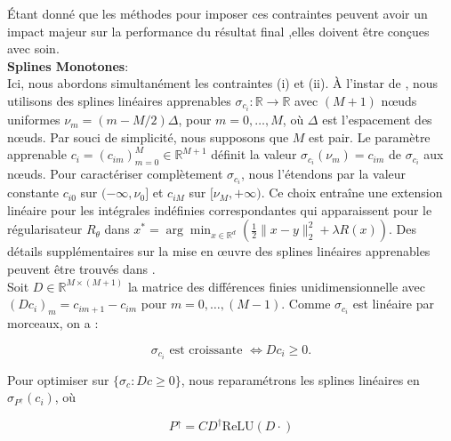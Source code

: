 \documentclass[a4paper, 12pt]{report} %
\begin{document}
Étant donné que les méthodes pour imposer ces contraintes peuvent avoir un impact majeur sur la performance du résultat final ,elles doivent être conçues avec soin.\\
\textbf{Splines Monotones}:\\
Ici, nous abordons simultanément les contraintes (i) et (ii). À l'instar de \cite{bohra2021learning,bohra2020learning}, nous utilisons des splines linéaires apprenables \( \sigma_{c_i} : \mathbb{R} \to \mathbb{R} \) avec \( (M + 1) \) nœuds uniformes \( \nu_m = (m - M/2) \Delta \), pour \( m = 0, \ldots, M \), où \( \Delta \) est l'espacement des nœuds. Par souci de simplicité, nous supposons que \( M \) est pair. Le paramètre apprenable \( c_i = (c_{i m})_{m=0}^M \in \mathbb{R}^{M+1} \) définit la valeur \( \sigma_{c_i}(\nu_m) = c_{i m} \) de \( \sigma_{c_i} \) aux nœuds. Pour caractériser complètement \( \sigma_{c_i} \), nous l'étendons par la valeur constante \( c_{i 0} \) sur \( (-\infty, \nu_0] \) et \( c_{i M} \) sur \( [\nu_M, +\infty) \). Ce choix entraîne une extension linéaire pour les intégrales indéfinies correspondantes qui apparaissent pour le régularisateur \( R_\theta \) dans $x^* = \arg \min_{x \in \mathbb{R}^d} \left( \frac{1}{2} \| x - y \|_2^2 + \lambda R(x) \right)$. Des détails supplémentaires sur la mise en œuvre des splines linéaires apprenables peuvent être trouvés dans \cite{bohra2020learning}.\\
Soit \( D \in \mathbb{R}^{M \times (M+1)} \) la matrice des différences finies unidimensionnelle avec \( (D c_i)_m = c_{i m+1} - c_{i m} \) pour \( m = 0, \ldots, (M - 1) \). Comme \( \sigma_{c_i} \) est linéaire par morceaux, on a :

\[
\sigma_{c_i} \text{ est croissante } \iff D c_i \geq 0. 
\]

Pour optimiser sur \( \{\sigma_c : D c \geq 0\} \), nous reparamétrons les splines linéaires en \( \sigma_{P^{\uparrow}}(c_i) \), où

\[
P^{\uparrow} = C D^{\dagger} \text{ReLU}(D \cdot) 
\]
\end{document}
